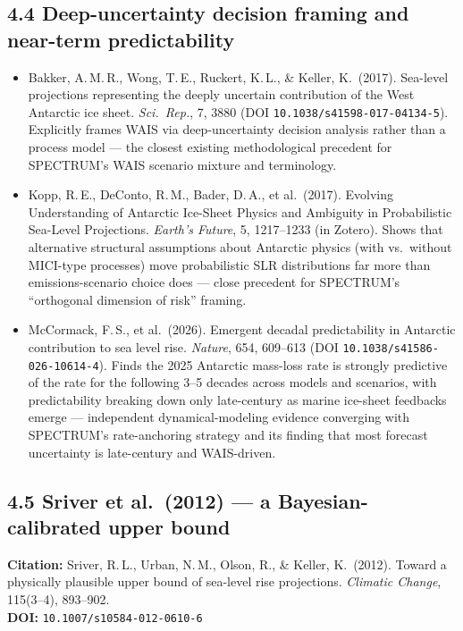 \documentclass[11pt]{article}
\begin{document}
\subsection*{4.4 Deep-uncertainty decision framing and near-term predictability}

\begin{itemize}[leftmargin=*]
\item Bakker, A.\,M.\,R., Wong, T.\,E., Ruckert, K.\,L., \& Keller, K.\
(2017). Sea-level projections representing the deeply uncertain
contribution of the West Antarctic ice sheet. \textit{Sci.\ Rep.}, 7, 3880
(DOI \texttt{10.1038/s41598-017-04134-5}). Explicitly frames WAIS via
deep-uncertainty decision analysis rather than a process model --- the
closest existing methodological precedent for SPECTRUM's WAIS scenario
mixture and terminology.
\item Kopp, R.\,E., DeConto, R.\,M., Bader, D.\,A., et al.\ (2017). Evolving
Understanding of Antarctic Ice-Sheet Physics and Ambiguity in Probabilistic
Sea-Level Projections. \textit{Earth's Future}, 5, 1217--1233 (in Zotero).
Shows that alternative structural assumptions about Antarctic physics (with
vs.\ without MICI-type processes) move probabilistic SLR distributions far
more than emissions-scenario choice does --- close precedent for
SPECTRUM's ``orthogonal dimension of risk'' framing.
\item McCormack, F.\,S., et al.\ (2026). Emergent decadal predictability in
Antarctic contribution to sea level rise. \textit{Nature}, 654, 609--613
(DOI \texttt{10.1038/s41586-026-10614-4}). Finds the 2025 Antarctic
mass-loss rate is strongly predictive of the rate for the following 3--5
decades across models and scenarios, with predictability breaking down only
late-century as marine ice-sheet feedbacks emerge --- independent
dynamical-modeling evidence converging with SPECTRUM's rate-anchoring
strategy and its finding that most forecast uncertainty is late-century and
WAIS-driven.
\end{itemize}

\subsection*{4.5 Sriver et al.\ (2012) --- a Bayesian-calibrated upper bound}

\noindent\textbf{Citation:} Sriver, R.\,L., Urban, N.\,M., Olson, R.,
\& Keller, K.\ (2012). Toward a physically plausible upper bound of
sea-level rise projections. \textit{Climatic Change}, 115(3--4), 893--902.\\
\textbf{DOI:} \texttt{10.1007/s10584-012-0610-6}
\end{document}

